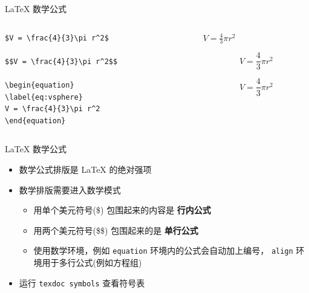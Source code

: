 \begin{frame}[fragile]{\LaTeX{} 数学公式}

\begin{columns}
\begin{column}{.5\textwidth}
\begin{verbatim}
$V = \frac{4}{3}\pi r^2$

$$V = \frac{4}{3}\pi r^2$$

\begin{equation}
\label{eq:vsphere}
V = \frac{4}{3}\pi r^2
\end{equation}
\end{verbatim}
\end{column}

\begin{column}{.5\textwidth}
$V = \frac{4}{3}\pi r^2$

$$V = \frac{4}{3}\pi r^2$$

\begin{equation}
\label{eq:vsphere}
V = \frac{4}{3}\pi r^2
\end{equation}
\end{column}
\end{columns}

\end{frame}

\begin{frame}{\LaTeX{} 数学公式}
\begin{itemize}
\item 数学公式排版是 \LaTeX{} 的绝对强项
\item 数学排版需要进入数学模式
	\begin{itemize}
	\item 用单个美元符号(\$) 包围起来的内容是 {\bf 行内公式}
	\item 用两个美元符号(\$\$) 包围起来的是 {\bf 单行公式}
	\item 使用数学环境，例如 \texttt{equation} 环境内的公式会自动加上编号，
		\texttt{align} 环境用于多行公式(例如方程组)
	\end{itemize}
\item 运行 \texttt{texdoc symbols} 查看符号表
\end{itemize}
\end{frame}

